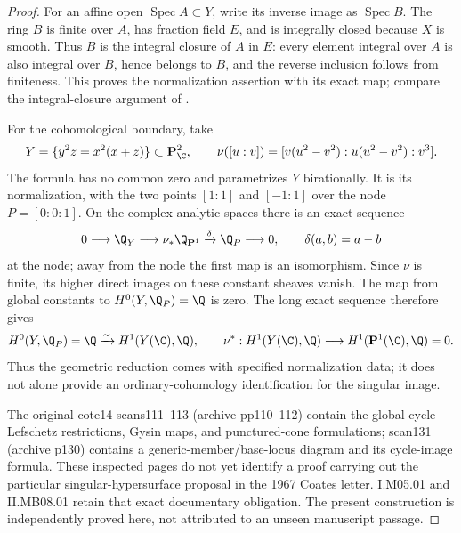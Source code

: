 \begin{proof}
For an affine open $\operatorname{Spec}A\subset Y$, write its inverse image as $\operatorname{Spec}B$. The ring $B$ is finite over $A$, has fraction field $E$, and is integrally closed because $X$ is smooth. Thus $B$ is the integral closure of $A$ in $E$: every element integral over $A$ is also integral over $B$, hence belongs to $B$, and the reverse inclusion follows from finiteness. This proves the normalization assertion with its exact map; compare the integral-closure argument of \cite[Tag 0AB1, Lemma 29.55.8]{AuditStacksFiniteNormalization}.

For the cohomological boundary, take
\[
 Y=\{y^2z=x^2(x+z)\}\subset\mathbf P^2_\C,
 \qquad
 \nu([u:v])=[v(u^2-v^2):u(u^2-v^2):v^3].
\]
The formula has no common zero and parametrizes $Y$ birationally. It is its normalization, with the two points $[1:1]$ and $[-1:1]$ over the node $P=[0:0:1]$. On the complex analytic spaces there is an exact sequence
\[
 0\longrightarrow\Q_Y\longrightarrow\nu_*\Q_{\mathbf P^1}
 \xrightarrow{\delta}\Q_P\longrightarrow0,
 \qquad \delta(a,b)=a-b
\]
at the node; away from the node the first map is an isomorphism. Since $\nu$ is finite, its higher direct images on these constant sheaves vanish. The map from global constants to $H^0(Y,\Q_P)=\Q$ is zero. The long exact sequence therefore gives
\[
 H^0(Y,\Q_P)=\Q\xrightarrow{\sim}H^1(Y(\C),\Q),
 \qquad
 \nu^*:H^1(Y(\C),\Q)\longrightarrow H^1(\mathbf P^1(\C),\Q)=0.
\]
Thus the geometric reduction comes with specified normalization data; it does not alone provide an ordinary-cohomology identification for the singular image.

The original cote14 scans111--113 (archive pp110--112) contain the global cycle-Lefschetz restrictions, Gysin maps, and punctured-cone formulations; scan131 (archive p130) contains a generic-member/base-locus diagram and its cycle-image formula. These inspected pages do not yet identify a proof carrying out the particular singular-hypersurface proposal in the 1967 Coates letter. I.M05.01 and II.MB08.01 retain that exact documentary obligation. The present construction is independently proved here, not attributed to an unseen manuscript passage.
\end{proof}
